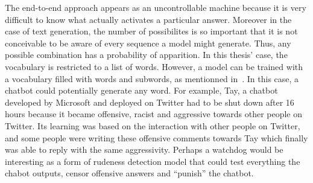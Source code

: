 
The end-to-end approach appears as an uncontrollable machine because it is very difficult to know what actually activates a particular answer. Moreover in the case of text generation, the number of possibilites is so important that it is not conceivable to be aware of every sequence a model might generate. Thus, any possible combination has a probability of apparition.
In this thesis' case, the vocabulary is restricted to a list of words. However, a model can be trained with a vocabulary filled with words and subwords, as mentionned in~\cite{1508.07909}. In this case, a chatbot could potentially generate any word.
For example, Tay, a chatbot developed by Microsoft and deployed on Twitter had to be shut down after 16 hours because it became offensive, racist and aggressive towards other people on Twitter. Its learning was based on the interaction with other people on Twitter, and some people were writing these offensive comments towards Tay which finally was able to reply with the same aggressivity.
Perhaps a watchdog would be interesting as a form of rudeness detection model that could test everything the chabot outputs, censor offensive answers and ``punish'' the chatbot.





